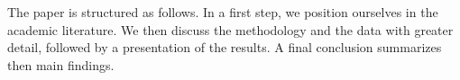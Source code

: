 The paper is structured as follows. In a first step, we position ourselves in the academic literature. We then discuss the methodology and the data with greater detail, followed by a presentation of the results. A final conclusion summarizes then main findings. 








